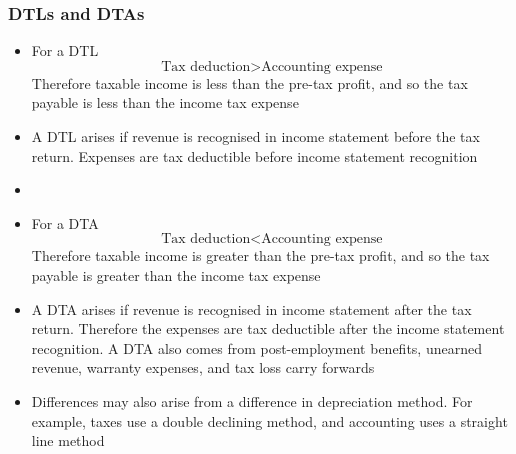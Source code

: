 \documentclass[../notes_compiled.tex]{subfiles}
\begin{document}
\subsubsection{DTLs and DTAs}
\begin{itemize}
\item For a DTL
\begin{equation*}
\text{Tax deduction} > \text{Accounting expense}
\end{equation*}
Therefore taxable income is less than the pre-tax profit, and so the tax payable is less than the income tax expense
\item A DTL arises if revenue is recognised in income statement before the tax return. Expenses are tax deductible before income statement recognition
\item[]
\item For a DTA
\begin{equation*}
\text{Tax deduction} < \text{Accounting expense}
\end{equation*}
Therefore taxable income is greater than the pre-tax profit, and so the tax payable is greater than the income tax expense
\item A DTA arises if revenue is recognised in income statement after the tax return. Therefore the expenses are tax deductible after the income statement recognition. A DTA also comes from post-employment benefits, unearned revenue, warranty expenses, and tax loss carry forwards
\item Differences may also arise from a difference in depreciation method. For example, taxes use a double declining method, and accounting uses a straight line method
\end{itemize}
\end{document}
